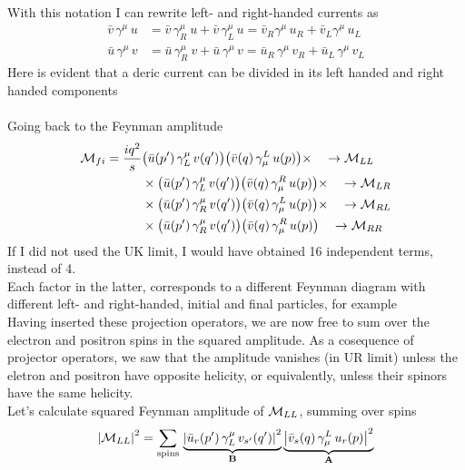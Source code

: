 \documentclass[TheoreticalPhy_ModB.tex]{subfiles}
\begin{document}
With this notation I can rewrite left- and right-handed currents as
\begin{align*}
\bar{v} \, \gamma^{\mu} \, u 	& = \bar{v} \, \gamma^{\mu}_R \ u + \bar{v} \, \gamma_L^{\mu} \, u 	
	= \bar{v}_R \gamma^{\mu} \, u_R + \bar{v}_L \gamma^{\mu} \,  u_L \\
\bar{u} \, \gamma^{\mu} \, v 	& = \bar{u} \, \gamma^{\mu}_R \ v + \bar{u} \, \gamma^{\mu} \, v
	= \bar{u}_R \, \gamma^{\mu} \, v_R + \bar{u}_L \, \gamma^{\mu} \, v_L
\end{align*}
Here is evident that a deric current can be divided in its left handed and right handed components\\ \\
Going back to the Feynman amplitude
\begin{align*}
\mathcal{M}_{fi} = \frac{iq^2}{s}	
	& 		\bigl( \bar{u}(p') \, \gamma^{\mu}_L \, v(q') \bigr) \bigl( \bar{v}(q) \, \gamma_{\mu}^L \, u(p) \bigr) \times \quad \to \mathcal{M}_{LL}\\
	& \times 	\bigl( \bar{u}(p') \, \gamma^{\mu}_L \, v(q') \bigr) \bigl( \bar{v}(q) \, \gamma_{\mu}^R \, u(p) \bigl) \times \quad \to \mathcal{M}_{LR}\\
	& \times 	\bigl( \bar{u}(p') \, \gamma^{\mu}_R \, v(q') \bigr) \bigl( \bar{v}(q) \, \gamma_{\mu}^L \, u(p) \bigr) \times \quad \to \mathcal{M}_{RL}\\
	& \times 	\bigl( \bar{u}(p') \, \gamma^{\mu}_R \, v(q') \bigr) \bigl( \bar{v}(q) \, \gamma_{\mu}^R \, u(p) \bigr)  \quad \to \mathcal{M}_{RR}
\end{align*}
If I did not used the UK limit, I would have obtained 16 independent terms, instead of 4.\\
Each factor in the latter, corresponds to a different Feynman diagram with different left- and right-handed, initial and final particles, for example\\
Having inserted these projection operators, we are now free to sum over the electron and positron spins in the squared amplitude. As a cosequence of projector operators, we saw that the amplitude vanishes (in UR limit) unless the eletron and positron have opposite helicity, or equivalently, unless their spinors have the same helicity.\\
Let's calculate squared Feynman amplitude of $\mathcal{M}_{LL}$, summing over spins
\[
\left\lvert \mathcal{M}_{LL} \right\rvert^2 = \sum_{\text{spins}} \,
	\underbrace{\left\lvert  \bar{u}_r(p') \, \gamma^{\mu}_L \, v_{s'}(q')  \right\rvert^2}_{\textbf{B}}
	\underbrace{\left\lvert  \bar{v}_s(q) \, \gamma^L_{\mu} \, u_r(p)  \right\rvert^2}_{\textbf{A}}
\]
\end{document}
